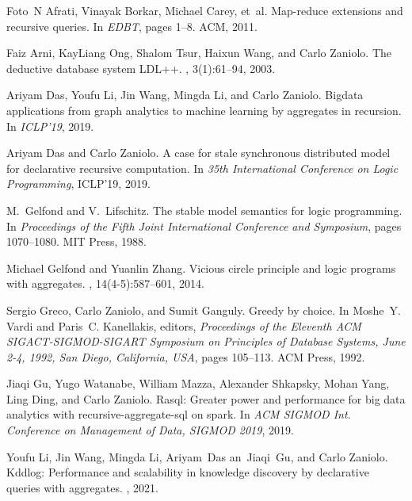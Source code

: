 \documentclass[11pt]{article}
\begin{document}
\begin{thebibliography}{10}
{\small
{}
Foto~N Afrati, Vinayak Borkar, Michael Carey, et~al.
\newblock Map-reduce extensions and recursive queries.
\newblock In {\em EDBT}, pages 1--8. ACM, 2011.

Faiz Arni, KayLiang Ong, Shalom Tsur, Haixun Wang, and Carlo Zaniolo.
\newblock The deductive database system {LDL++}.
, 3(1):61--94, 2003.

Ariyam Das, Youfu Li, Jin Wang, Mingda Li, and Carlo Zaniolo.
\newblock Bigdata applications from graph analytics to machine learning by
  aggregates in recursion.
\newblock In {\em ICLP'19}, 2019.

Ariyam Das and Carlo Zaniolo.
\newblock A case for stale synchronous distributed model for declarative
  recursive computation.
\newblock In {\em 35th International Conference on Logic Programming}, ICLP'19, 2019.

M.~Gelfond and V.~Lifschitz.
\newblock The stable model semantics for logic programming.
\newblock In {\em Proceedings of the Fifth Joint International Conference and
  Symposium}, pages 1070--1080. MIT Press, 1988.

Michael Gelfond and Yuanlin Zhang.
\newblock Vicious circle principle and logic programs with aggregates.
, 14(4-5):587--601, 2014.

Sergio Greco, Carlo Zaniolo, and Sumit Ganguly.
\newblock Greedy by choice.
\newblock In Moshe~Y. Vardi and Paris~C. Kanellakis, editors, {\em Proceedings
  of the Eleventh {ACM} {SIGACT-SIGMOD-SIGART} Symposium on Principles of
  Database Systems, June 2-4, 1992, San Diego, California, {USA}}, pages
  105--113. {ACM} Press, 1992.

Jiaqi Gu, Yugo Watanabe, William Mazza, Alexander Shkapsky, Mohan Yang, Ling
  Ding, and Carlo Zaniolo.
\newblock Rasql: Greater power and performance for big data analytics with
  recursive-aggregate-sql on spark.
\newblock In {\em {ACM} {SIGMOD} Int. Conference on Management of Data, SIGMOD
  2019}, 2019.

Youfu Li, Jin Wang, Mingda Li, Ariyam~Das an~Jiaqi~Gu, and Carlo Zaniolo.
\newblock Kddlog: Performance and scalability in knowledge discovery by
  declarative queries with aggregates.
, 2021.

}
\end{thebibliography}
\end{document}
